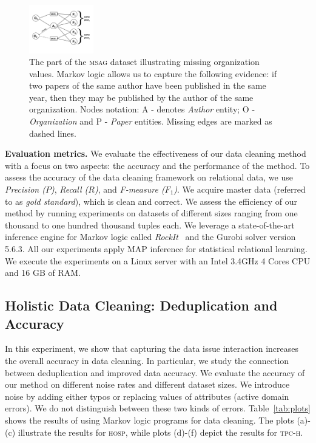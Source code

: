 \begin{figure}[t]
    \centering
    \includegraphics[width=0.25\textwidth, trim = 0mm 4mm 0mm 5mm, clip]{img/graph01.png}
    \caption{The part of the \textsc{msag} dataset illustrating missing organization values. Markov logic allows us to capture the following evidence: if two papers of the same author have been published in the same year, then they may be published by the author of the same organization. Nodes notation: A - denotes \textit{Author} entity; O - \textit{Organization} and P - \textit{Paper} entities. Missing edges are marked as dashed lines.}
    \label{fig:msagmissing}
\end{figure}

\textbf{Evaluation metrics.} We evaluate the effectiveness of our data cleaning method with a focus on two aspects: the accuracy and the performance of the method. To assess the accuracy of the data cleaning framework on relational data, we use \textit{Precision ($P$)}, \textit{Recall ($R$)}, and \textit{F-measure ($F_1$)}. We acquire master data (referred to as \textit{gold standard}), which is clean and correct. We assess the efficiency of our method by running experiments on datasets of different sizes ranging from one thousand to one hundred thousand tuples each. We leverage a state-of-the-art inference engine for Markov logic called \textit{RockIt}~\cite{NoessnerNS13} and the Gurobi solver version 5.6.3. All our experiments apply MAP inference for statistical relational learning. We execute the experiments on a Linux server with an Intel 3.4GHz 4 Cores CPU and 16 GB of RAM.


\subsection{Holistic Data Cleaning: Deduplication and Accuracy}
\label{subsec:exp1}
In this experiment, we show that capturing the data issue interaction increases the overall accuracy in data cleaning. In particular, we study the connection between deduplication and improved data accuracy. We evaluate the accuracy of our method on different noise rates and different dataset sizes. We introduce noise by adding either typos or replacing values of attributes (active domain errors). We do not distinguish between these two kinds of errors. Table~\ref{tab:plots} shows the results of using Markov logic programs for data cleaning. The plots (a)-(c) illustrate the results for \textsc{hosp}, while plots (d)-(f) depict the results for \textsc{tpc-h}. %

